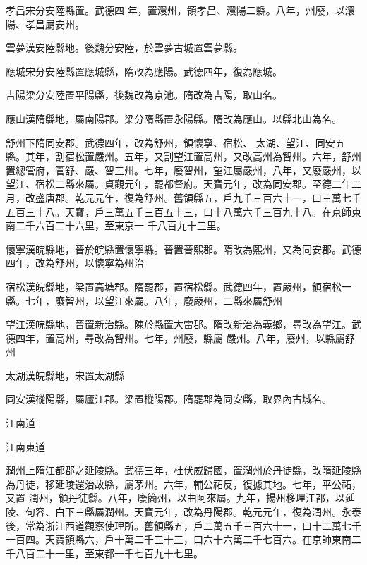 \begin{pinyinscope}
 孝昌宋分安陸縣置。武德四
 年，置澴州，領孝昌、澴陽二縣。八年，州廢，以澴陽、孝昌屬安州。



 雲夢漢安陸縣地。後魏分安陸，於雲夢古城置雲夢縣。



 應城宋分安陸縣置應城縣，隋改為應陽。武德四年，復為應城。



 吉陽梁分安陸置平陽縣，後魏改為京池。隋改為吉陽，取山名。



 應山漢隋縣地，屬南陽郡。梁分隋縣置永陽縣。隋改為應山。以縣北山為名。



 舒州下隋同安郡。武德四年，改為舒州，領懷寧、宿松、
 太湖、望江、同安五縣。其年，割宿松置嚴州。五年，又割望江置高州，又改高州為智州。六年，舒州置總管府，管舒、嚴、智三州。七年，廢智州，望江屬嚴州，八年，又廢嚴州，以望江、宿松二縣來屬。貞觀元年，罷都督府。天寶元年，改為同安郡。至德二年二月，改盛唐郡。乾元元年，復為舒州。舊領縣五，戶九千三百六十一，口三萬七千五百三十八。天寶，戶三萬五千三百五十三，口十八萬六千三百九十八。在京師東南二千六百二十六里，至東京一
 千八百九十三里。



 懷寧漢皖縣地，晉於皖縣置懷寧縣。晉置晉熙郡。隋改為熙州，又為同安郡。武德四年，改為舒州，以懷寧為州治



 宿松漢皖縣地，梁置高塘郡。隋罷郡，置宿松縣。武德四年，置嚴州，領宿松一縣。七年，廢智州，以望江來屬。八年，廢嚴州，二縣來屬舒州



 望江漢皖縣地，晉置新治縣。陳於縣置大雷郡。隋改新治為義鄉，尋改為望江。武德四年，置高州，尋改為智州。七年，州廢，縣屬
 嚴州。八年，廢州，以縣屬舒州



 太湖漢皖縣地，宋置太湖縣



 同安漢樅陽縣，屬廬江郡。梁置樅陽郡。隋罷郡為同安縣，取界內古城名。



 江南道



 江南東道



 潤州上隋江都郡之延陵縣。武德三年，杜伏威歸國，置潤州於丹徒縣，改隋延陵縣為丹徒，移延陵還治故縣，屬茅州。六年，輔公祏反，復據其地。七年，平公祏，又置
 潤州，領丹徒縣。八年，廢簡州，以曲阿來屬。九年，揚州移理江都，以延陵、句容、白下三縣屬潤州。天寶元年，改為丹陽郡。乾元元年，復為潤州。永泰後，常為浙江西道觀察使理所。舊領縣五，戶二萬五千三百六十一，口十二萬七千一百四。天寶領縣六，戶十萬二千三十三，口六十六萬二千七百六。在京師東南二千八百二十一里，至東都一千七百九十七里。




\end{pinyinscope}
